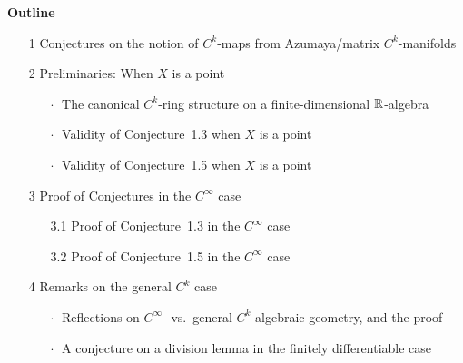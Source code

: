\documentclass[11pt]{article}
\numberwithin{equation}{subsection}
\begin{document}
\begin{flushleft}
{\bf Outline}
\end{flushleft}
%
\nopagebreak
%
{\small
 \baselineskip 12pt  %
 \begin{itemize}
    \item[1]
     Conjectures on the notion of $C^k$-maps from Azumaya/matrix $C^k$-manifolds	 	
   	
    \item[2]
	 Preliminaries: When $X$ is a point	
	  \vspace{-.6ex}
	  \begin{itemize}
	   \item[\Large$\cdot\;$]
         The canonical $C^k$-ring structure on a finite-dimensional ${\Bbb R}$-algebra

	   \item[\Large$\cdot\;$]	
         Validity of Conjecture~1.3 when $X$ is a point
						
       \item[\Large$\cdot\;$]
         Validity of Conjecture~1.5 when $X$ is a point
	  \end{itemize}
	
    \item[3]	
	 Proof of Conjectures in the $C^{\infty}$ case
	  \vspace{-.6ex}
	  \begin{itemize}
        \item[3.1]		
		 Proof of Conjecture~1.3 in the $C^{\infty}$ case

	    \item[3.2]
	     Proof of Conjecture~1.5 in the $C^{\infty}$ case		
	  \end{itemize}
	    	
	\item[4]
     Remarks on the general $C^k$ case	
	  \vspace{-.6ex}
	  \begin{itemize}
	    \item[\Large$\cdot\;$]
          Reflections on $C^{\infty}$- vs.\ general $C^k$-algebraic geometry, and the proof

	    \item[\Large$\cdot\;$]	
          A conjecture on a division lemma in the finitely differentiable case
	  \end{itemize}
 \end{itemize}
} %
\end{document}
